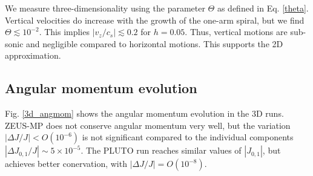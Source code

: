 We measure three-dimensionality using the parameter $\Theta$ as
defined in Eq. \ref{theta}.  Vertical velocities
do increase with the growth of the one-arm spiral, 
but we find  $\Theta \lesssim 10^{-2}$. This implies $|v_z/c_s|\lesssim
0.2$ for $h=0.05$. Thus, vertical motions are sub-sonic and negligible
compared to horizontal motions. This supports the 2D approximation. 


\subsection{Angular momentum evolution}

Fig. \ref{3d_angmom} shows the angular momentum evolution in the 3D
runs. ZEUS-MP does not conserve angular momentum very well, but
the variation $|\Delta J/J|< O(10^{-6})$ is not significant compared
to the individual components $|\Delta J_{0,1}/J|\sim 
5\times10^{-5}$. The PLUTO run reaches similar values of
$|J_{0,1}|$, but achieves better conervation, with $|\Delta
J/J|=O(10^{-8})$. 

